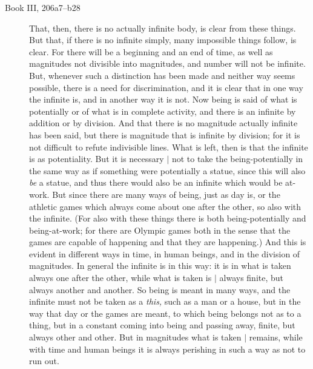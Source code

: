 \documentclass[polutonikogreek,english,twoside,openright]{article}
\begin{document}
\begin{description}

\item[Book III, 206a7--b28] That, then, there is no actually infinite
  body, is clear from these things.  But that, if there is no infinite
  simply, many impossible things follow, is clear.  For there will be
  a beginning and an end of time, as well as magnitudes not divisible
  into magnitudes, and number will not be infinite.  But, whenever
  such a distinction has been made and neither way seems possible,
  there is a need for discrimination, and it is clear that in one way
  the infinite is, and in another way it is not.  Now being is said of
  what is potentially or of what is in complete activity, and there is
  an infinite by addition or by division.  And that there is no
  magnitude actually infinite has been said, but there is magnitude
  that is infinite by division; for it is not difficult to refute
  indivisible lines.  What is left, then is that the infinite is as
  potentiality.  But it is necessary $|$ not to
  take the being-potentially in the same way as if something were
  potentially a statue, since this will also \emph{be} a statue, and
  thus there would also be an infinite which would be at-work.  But
  since there are many ways of being, just as day is, or the athletic
  games which always come about one after the other, so also with the
  infinite. (For also with these things there is both
  being-potentially and being-at-work; for there are Olympic games
  both in the sense that the games are capable of happening and that
  they are happening.)  And this is evident in different ways in time,
  in human beings, and in the division of magnitudes. In general the
  infinite is in this way: it is in what is taken always one after the
  other, while what is taken is $|$ always finite,
  but always another and another.  So being is meant in many ways, and
  the infinite must not be taken as a \emph{this,} such as a man or a
  house, but in the way that day or the games are meant, to which
  being belongs not as to a thing, but in a constant coming into being
  and passing away, finite, but always other and other.  But in
  magnitudes what is taken $|$ remains, while with
  time and human beings it is always perishing in such a way as not to
  run out.


\end{description}
\end{document}
